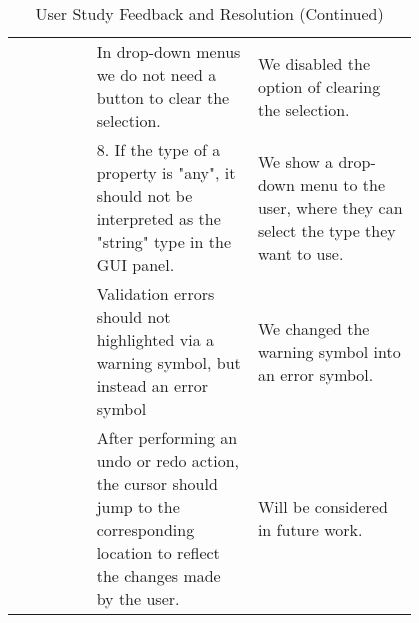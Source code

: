 \begin{table*}
\begin{tabular}{|c|p{0.4\linewidth}|p{0.4\linewidth}|}
        \cline{2-3}
        & In drop-down menus we do not need a button to clear the selection. &
        We disabled the option of clearing the selection. \\
        \cline{2-3}
        & 8. If the type of a property is "any", it should not be interpreted as the "string" type in the GUI panel. &
        We show a drop-down menu to the user, where they can select the type they want to use. \\
        \cline{2-3}
        & Validation errors should not highlighted via a warning symbol, but instead an error symbol &
        We changed the warning symbol into an error symbol. \\
        \cline{2-3}
        & After performing an undo or redo action, the cursor should jump to the corresponding location to reflect the changes made by the user.&
        Will be considered in future work. \\
        \hline
    \end{tabular}
    \caption* {User Study Feedback and Resolution (Continued)} \label{tab:user_study1}
\end{table*}


\clearpage %

